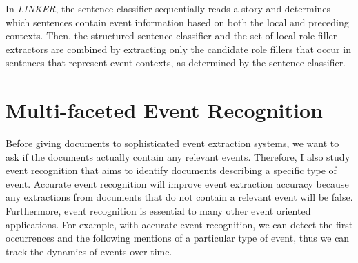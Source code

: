 In {\it LINKER}, the sentence classifier sequentially reads a
story and determines which sentences contain event
information based on both the local and preceding contexts. 
Then, the structured sentence classifier and the set of local role filler extractors are combined by extracting only the candidate role
fillers that occur in sentences that represent event contexts, as determined by the sentence classifier. 

\section{Multi-faceted Event Recognition}
Before giving documents to sophisticated event extraction systems, 
we want to ask if the documents actually contain any relevant events. 
Therefore, I also study event recognition that 
aims to identify documents describing a specific
type of event.  
Accurate event recognition will improve event extraction accuracy 
because any extractions from documents that do not contain a relevant event 
will be false. 
Furthermore, event recognition is essential to many other event oriented applications.
For example,   
with accurate event recognition, we can detect the first occurrences and
the following mentions of a particular type of 
event, thus we can track the dynamics of
events over time.

